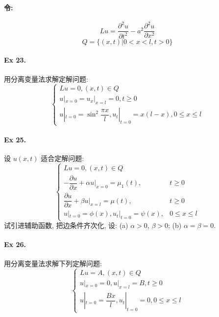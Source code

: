 \paragraph{令:}
\[
Lu = \frac{\partial^2 u}{\partial t^2} - a^2 \frac{\partial^2 u}{\partial x^2}
\]
\[ Q = \{ (x, t) | 0 < x < l, t > 0 \} \]

\paragraph{Ex 23.}
用分离变量法求解定解问题:
\[ \begin{cases}
Lu = 0, (x, t) \in Q \\
u|_{x=0} = u_x|_{x=l} = 0, t \geq 0 \\
u|_{t=0} = \sin^2 \dfrac{\pi x}{l}, u_t|_{t=0} = x(l - x), 0 \leq x \leq l
\end{cases} \]

\paragraph{Ex 25.}
设 $u(x, t)$ 适合定解问题:
\[ \begin{cases}
Lu = 0, (x, t) \in Q \\
-\dfrac{\partial u}{\partial x} + \alpha u|_{x=0} = \mu_1(t), & t \geq 0 \\
\dfrac{\partial u}{\partial x} + \beta u|_{x=l} = \mu(t), & t \geq 0 \\
u|_{t=0} = \phi(x), u_t|_{t=0} = \psi(x), & 0 \leq x \leq l
\end{cases} \]
试引进辅助函数, 把边条件齐次化, 设: (a) $\alpha > 0$, $\beta > 0$; (b)
$\alpha = \beta = 0$.

\paragraph{Ex 26.}
用分离变量法求解下列定解问题:
\[ \begin{cases}
Lu = A, (x, t) \in Q \\
u|_{x=0} = 0, u|_{x=l} = B, t \geq 0 \\
u|_{t=0} = \dfrac{Bx}{l}, u_t|_{t=0} = 0, 0 \leq x \leq l
\end{cases} \]

